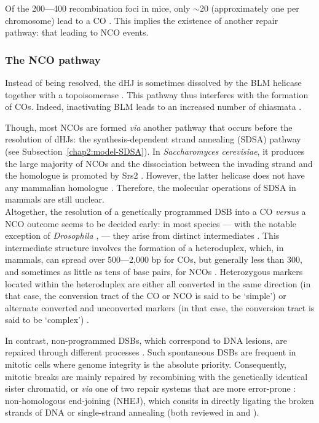 Of the 200—400 recombination foci in mice, only $\sim$20 (approximately one per chromosome) lead to a CO \citep{baudat2007regulating}.
This implies the existence of another repair pathway: that leading to NCO events.






\subsubsection{The NCO pathway}
Instead of being resolved, the dHJ is sometimes dissolved by the BLM helicase together with a topoisomerase \citep{wu2003bloom}. 
This pathway thus interferes with the formation of COs. Indeed, inactivating BLM leads to an increased number of chiasmata \citep{holloway2010mammalian}.

Though, most NCOs are formed \textit{via} another pathway that occurs before the resolution of dHJs: the synthesis-dependent strand annealing (SDSA) pathway (see Subsection~\ref{chap2:model-SDSA}).
In \textit{Saccharomyces cerevisiae}, it produces the large majority of NCOs \citep{martini2011genomewide} and the dissociation between the invading strand and the homologue is promoted by Srs2 \citep{ira2003srs2}.
However, the latter helicase does not have any mammalian homologue \citep{spell2004examination}. Therefore, the molecular operations of SDSA in mammals are still unclear.\\


Altogether, the resolution of a genetically programmed DSB into a CO \textit{versus} a NCO outcome seems to be decided early: in most species — with the notable exception of \textit{Drosophila} \citep{crown2014eliminating}, — they arise from distinct intermediates \citep[reviewed in][]{hunter2015meiotic}.
This intermediate structure involves the formation of a heteroduplex, which, in mammals, can spread over 500—2,000 bp for COs, but generally less than 300, and sometimes as little as tens of base pairs, for NCOs \citep{jeffreys2004intense,ng2008quantitative}.
Heterozygous markers located within the heteroduplex are either all converted in the same direction (in that case, the conversion tract of the CO or NCO is said to be ‘simple’) or alternate converted and unconverted markers (in that case, the conversion tract is said to be ‘complex’) \citep{borts1989length}.

In contrast, non-programmed DSBs, which correspond to DNA lesions, are repaired through different processes \citep[reviewed in][]{sung2006mechanism}.
Such spontaneous DSBs are frequent in mitotic cells where genome integrity is the absolute priority.
Consequently, mitotic breaks are mainly repaired by recombining with the genetically identical sister chromatid, or \textit{via} one of two repair systems that are more error-prone \citep{smith2001influence}: non-homologous end-joining (NHEJ), which consits in directly ligating the broken strands of DNA \citep{weterings2004mechanism} or single-strand annealing (both reviewed in \citealp{helleday2003pathways} and \citealp{moynahan2010mitotic}).

